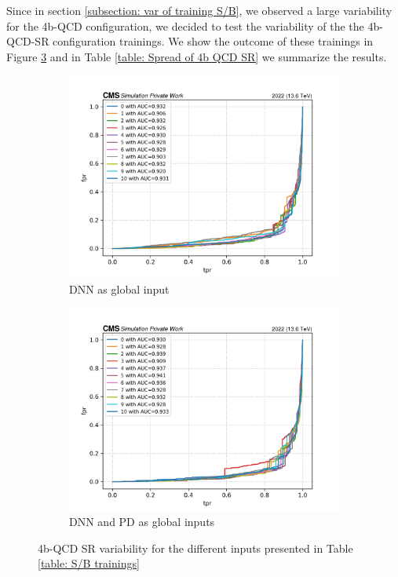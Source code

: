 Since in section \ref{subsection: var of training S/B}, we observed a large variability for the 4b-QCD configuration, we decided to test the variability of the the 4b-QCD-SR configuration trainings. We show the outcome of these trainings in Figure \ref{fig: 4b QCD SR variability} and in Table \ref{table: Spread of 4b QCD SR} we summarize the results. 

\begin{figure}[hbt]
\centering
\begin{subfigure}{.5\textwidth}
  \centering
  \includegraphics[width=1.1\linewidth]{Images/7.S:B/Variability/4b QCD sr dnn.png}
  \caption{DNN as global input}
  \label{fig: 4b QCD SR DNN}
\end{subfigure}%
\begin{subfigure}{.5\textwidth}
  \centering
  \includegraphics[width=1.1\linewidth]{Images/7.S:B/Variability/4b QCD sr dnn + prob diff.png}
  \caption{DNN and PD as global inputs}
  \label{fig: 4b QCD SR DNN PD}
\end{subfigure}
\caption{4b-QCD SR variability for the different inputs presented in Table \ref{table: S/B trainings}}
\label{fig: 4b QCD SR variability}
\end{figure}

